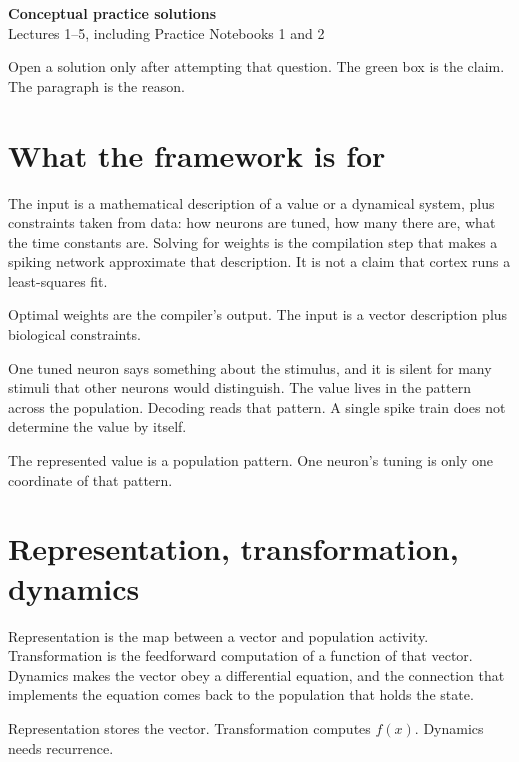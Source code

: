 \documentclass[11pt,letterpaper]{article}
\newcommand{\ans}[1]{\par\vspace{2pt}{\bfseries #1}\quad}
\begin{document}
\begin{center}
{\Large\bfseries Conceptual practice solutions}\\[2pt]
{\large Lectures 1--5, including Practice Notebooks 1 and 2}
\end{center}

Open a solution only after attempting that question. The green box is the claim. The paragraph is the reason.

\section{What the framework is for}

\ans{1.}
The input is a mathematical description of a value or a dynamical system, plus constraints taken from data: how neurons are tuned, how many there are, what the time constants are. Solving for weights is the compilation step that makes a spiking network approximate that description. It is not a claim that cortex runs a least-squares fit.
\begin{result}
Optimal weights are the compiler's output. The input is a vector description plus biological constraints.
\end{result}

\ans{2.}
One tuned neuron says something about the stimulus, and it is silent for many stimuli that other neurons would distinguish. The value lives in the pattern across the population. Decoding reads that pattern. A single spike train does not determine the value by itself.
\begin{result}
The represented value is a population pattern. One neuron's tuning is only one coordinate of that pattern.
\end{result}

\section{Representation, transformation, dynamics}

\ans{1.}
Representation is the map between a vector and population activity. Transformation is the feedforward computation of a function of that vector. Dynamics makes the vector obey a differential equation, and the connection that implements the equation comes back to the population that holds the state.
\begin{result}
Representation stores the vector. Transformation computes \(f(x)\). Dynamics needs recurrence.
\end{result}
\end{document}
